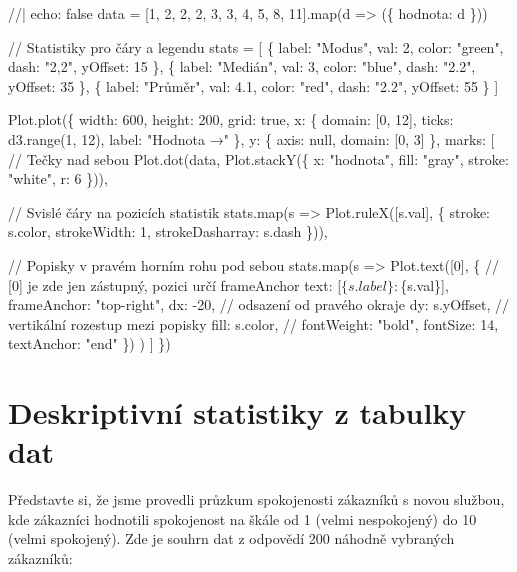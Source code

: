 \documentclass[
  czech,
  11pt,
  letterpaper,
  DIV=11,
  numbers=noendperiod]{scrreprt}
\newenvironment{Shaded}{\begin{snugshade}}{\end{snugshade}}
\newcommand{\NormalTok}[1]{\textcolor[rgb]{0.00,0.23,0.31}{#1}}
\begin{document}
\begin{Shaded}
\begin{Highlighting}[]
\NormalTok{//| echo: false}
\NormalTok{data = [1, 2, 2, 2, 3, 3, 4, 5, 8, 11].map(d =\textgreater{} (\{ hodnota: d \}))}

\NormalTok{// Statistiky pro čáry a legendu}
\NormalTok{stats = [}
\NormalTok{  \{ label: "Modus", val: 2, color: "green", dash: "2,2", yOffset: 15 \},}
\NormalTok{  \{ label: "Medián", val: 3, color: "blue", dash: "2.2", yOffset: 35 \},}
\NormalTok{  \{ label: "Průměr", val: 4.1, color: "red", dash: "2.2", yOffset: 55 \}}
\NormalTok{]}

\NormalTok{Plot.plot(\{}
\NormalTok{  width: 600,}
\NormalTok{  height: 200,}
\NormalTok{  grid: true,}
\NormalTok{  x: \{  domain: [0, 12], }
\NormalTok{        ticks: d3.range(1, 12), }
\NormalTok{        label: "Hodnota →" \},}
\NormalTok{  y: \{  axis: null, }
\NormalTok{        domain: [0, 3] \}, }
\NormalTok{  marks: [}
\NormalTok{    // Tečky nad sebou}
\NormalTok{    Plot.dot(data, Plot.stackY(\{ x: "hodnota", fill: "gray", stroke: "white", r: 6 \})),}

\NormalTok{    // Svislé čáry na pozicích statistik}
\NormalTok{    stats.map(s =\textgreater{} Plot.ruleX([s.val], \{ stroke: s.color, strokeWidth: 1, strokeDasharray: s.dash \})),}

\NormalTok{    // Popisky v pravém horním rohu pod sebou}
\NormalTok{    stats.map(s =\textgreater{} }
\NormalTok{      Plot.text([0], \{ // [0] je zde jen zástupný, pozici určí frameAnchor}
\NormalTok{        text: [\textasciigrave{}$\{s.label\}: $\{s.val\}\textasciigrave{}],}
\NormalTok{        frameAnchor: "top{-}right",}
\NormalTok{        dx: {-}20,        // odsazení od pravého okraje}
\NormalTok{        dy: s.yOffset,  // vertikální rozestup mezi popisky}
\NormalTok{        fill: s.color,}
\NormalTok{        // fontWeight: "bold",}
\NormalTok{        fontSize: 14,}
\NormalTok{        textAnchor: "end"}
\NormalTok{      \})}
\NormalTok{    )}
\NormalTok{  ]}
\NormalTok{\})}
\end{Highlighting}
\end{Shaded}

\chapter{Deskriptivní statistiky z tabulky
dat}\label{deskriptivnuxed-statistiky-z-tabulky-dat}

Představte si, že jsme provedli průzkum spokojenosti zákazníků s novou
službou, kde zákazníci hodnotili spokojenost na škále od 1 (velmi
nespokojený) do 10 (velmi spokojený). Zde je souhrn dat z odpovědí 200
náhodně vybraných zákazníků:
\end{document}
